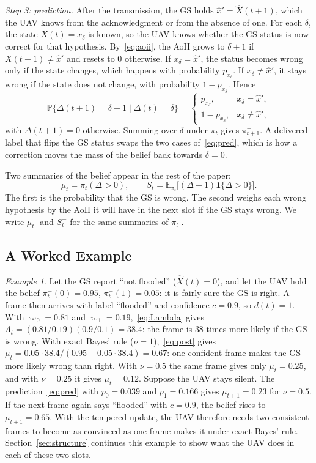 \documentclass[5p,twocolumn]{elsarticle}
\theoremstyle{remark}
\newtheorem{example}{Example}
\newcommand{\E}{\mathbb{E}}
\newcommand{\Prob}{\mathbb{P}}
\newcommand{\ind}[1]{\mathbf{1}\{#1\}}
\newcommand{\xh}{\hat{x}}
\begin{document}
\emph{Step 3: prediction.} After the transmission, the GS holds $\xh'=\hat X(t+1)$, which the UAV knows from the acknowledgment or from the absence of one. For each $\delta$, the state $X(t)=x_\delta$ is known, so the UAV knows whether the GS status is now correct for that hypothesis. By~\eqref{eq:aoii}, the AoII grows to $\delta+1$ if $X(t+1)\neq\xh'$ and resets to 0 otherwise. If $x_\delta=\xh'$, the status becomes wrong only if the state changes, which happens with probability $p_{x_\delta}$. If $x_\delta\neq\xh'$, it stays wrong if the state does not change, with probability $1-p_{x_\delta}$. Hence
\begin{equation}\label{eq:pred}
\Prob\big\{\Delta(t+1)=\delta+1\mid\Delta(t)=\delta\big\}=\begin{cases}p_{x_\delta}, & x_\delta=\xh',\\ 1-p_{x_\delta}, & x_\delta\neq\xh',\end{cases}
\end{equation}
with $\Delta(t+1)=0$ otherwise. Summing over $\delta$ under $\pi_t$ gives $\pi^-_{t+1}$. A delivered label that flips the GS status swaps the two cases of~\eqref{eq:pred}, which is how a correction moves the mass of the belief back towards $\delta=0$.

Two summaries of the belief appear in the rest of the paper:
\begin{equation}\label{eq:musum}
\mu_t=\pi_t(\Delta>0),\qquad S_t=\E_{\pi_t}\big[(\Delta+1)\ind{\Delta>0}\big].
\end{equation}
The first is the probability that the GS is wrong. The second weighs each wrong hypothesis by the AoII it will have in the next slot if the GS stays wrong. We write $\mu^-_t$ and $S^-_t$ for the same summaries of $\pi^-_t$.

\subsection{A Worked Example}
\begin{example}\label{ex:belief}
Let the GS report ``not flooded'' ($\hat X(t)=0$), and let the UAV hold the belief $\pi^-_t(0)=0.95$, $\pi^-_t(1)=0.05$: it is fairly sure the GS is right. A frame then arrives with label ``flooded'' and confidence $c=0.9$, so $d(t)=1$. With $\varpi_0=0.81$ and $\varpi_1=0.19$,~\eqref{eq:Lambda} gives $\Lambda_t=(0.81/0.19)(0.9/0.1)=38.4$: the frame is $38$ times more likely if the GS is wrong. With exact Bayes' rule ($\nu=1$),~\eqref{eq:post} gives $\mu_t=0.05\cdot38.4/(0.95+0.05\cdot38.4)=0.67$: one confident frame makes the GS more likely wrong than right. With $\nu=0.5$ the same frame gives only $\mu_t=0.25$, and with $\nu=0.25$ it gives $\mu_t=0.12$. Suppose the UAV stays silent. The prediction~\eqref{eq:pred} with $p_0=0.039$ and $p_1=0.166$ gives $\mu^-_{t+1}=0.23$ for $\nu=0.5$. If the next frame again says ``flooded'' with $c=0.9$, the belief rises to $\mu_{t+1}=0.65$. With the tempered update, the UAV therefore needs two consistent frames to become as convinced as one frame makes it under exact Bayes' rule. Section~\ref{sec:structure} continues this example to show what the UAV does in each of these two slots.
\end{example}
\end{document}
